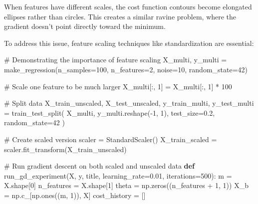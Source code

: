 \documentclass[
  letterpaper,
  DIV=11,
  numbers=noendperiod]{scrreprt}
\newenvironment{Shaded}{\begin{snugshade}}{\end{snugshade}}
\newcommand{\CommentTok}[1]{\textcolor[rgb]{0.37,0.37,0.37}{#1}}
\newcommand{\DecValTok}[1]{\textcolor[rgb]{0.68,0.00,0.00}{#1}}
\newcommand{\FloatTok}[1]{\textcolor[rgb]{0.68,0.00,0.00}{#1}}
\newcommand{\KeywordTok}[1]{\textcolor[rgb]{0.00,0.23,0.31}{\textbf{#1}}}
\newcommand{\NormalTok}[1]{\textcolor[rgb]{0.00,0.23,0.31}{#1}}
\newcommand{\OperatorTok}[1]{\textcolor[rgb]{0.37,0.37,0.37}{#1}}
\begin{document}
When features have different scales, the cost function contours become
elongated ellipses rather than circles. This creates a similar ravine
problem, where the gradient doesn't point directly toward the minimum.

To address this issue, feature scaling techniques like standardization
are essential:

\begin{Shaded}
\begin{Highlighting}[]
\CommentTok{\# Demonstrating the importance of feature scaling}
\NormalTok{X\_multi, y\_multi }\OperatorTok{=}\NormalTok{ make\_regression(n\_samples}\OperatorTok{=}\DecValTok{100}\NormalTok{, n\_features}\OperatorTok{=}\DecValTok{2}\NormalTok{, noise}\OperatorTok{=}\DecValTok{10}\NormalTok{, random\_state}\OperatorTok{=}\DecValTok{42}\NormalTok{)}

\CommentTok{\# Scale one feature to be much larger}
\NormalTok{X\_multi[:, }\DecValTok{1}\NormalTok{] }\OperatorTok{=}\NormalTok{ X\_multi[:, }\DecValTok{1}\NormalTok{] }\OperatorTok{*} \DecValTok{100}

\CommentTok{\# Split data}
\NormalTok{X\_train\_unscaled, X\_test\_unscaled, y\_train\_multi, y\_test\_multi }\OperatorTok{=}\NormalTok{ train\_test\_split(}
\NormalTok{    X\_multi, y\_multi.reshape(}\OperatorTok{{-}}\DecValTok{1}\NormalTok{, }\DecValTok{1}\NormalTok{), test\_size}\OperatorTok{=}\FloatTok{0.2}\NormalTok{, random\_state}\OperatorTok{=}\DecValTok{42}
\NormalTok{)}

\CommentTok{\# Create scaled version}
\NormalTok{scaler }\OperatorTok{=}\NormalTok{ StandardScaler()}
\NormalTok{X\_train\_scaled }\OperatorTok{=}\NormalTok{ scaler.fit\_transform(X\_train\_unscaled)}

\CommentTok{\# Run gradient descent on both scaled and unscaled data}
\KeywordTok{def}\NormalTok{ run\_gd\_experiment(X, y, title, learning\_rate}\OperatorTok{=}\FloatTok{0.01}\NormalTok{, iterations}\OperatorTok{=}\DecValTok{500}\NormalTok{):}
\NormalTok{    m }\OperatorTok{=}\NormalTok{ X.shape[}\DecValTok{0}\NormalTok{]}
\NormalTok{    n\_features }\OperatorTok{=}\NormalTok{ X.shape[}\DecValTok{1}\NormalTok{]}
\NormalTok{    theta }\OperatorTok{=}\NormalTok{ np.zeros((n\_features }\OperatorTok{+} \DecValTok{1}\NormalTok{, }\DecValTok{1}\NormalTok{))}
\NormalTok{    X\_b }\OperatorTok{=}\NormalTok{ np.c\_[np.ones((m, }\DecValTok{1}\NormalTok{)), X]}
\NormalTok{    cost\_history }\OperatorTok{=}\NormalTok{ []}
    

\end{Highlighting}
\end{Shaded}
\end{document}
